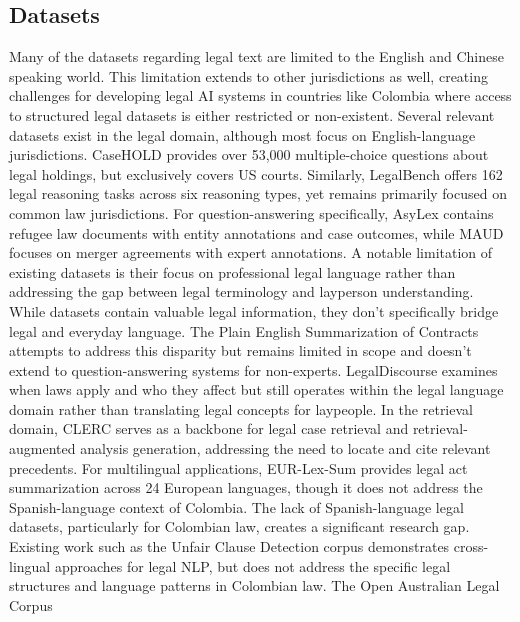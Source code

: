 \subsection{Datasets}
Many of the datasets regarding legal text are limited to the English and
Chinese speaking world. This limitation extends to other jurisdictions as well, 
creating challenges for developing legal AI systems in countries like Colombia 
where access to structured legal datasets is either restricted or non-existent.
Several relevant datasets exist in the legal domain, although most focus on 
English-language jurisdictions. CaseHOLD \cite{zheng2021does} provides over 
53,000 multiple-choice questions about legal holdings, but exclusively 
covers US courts. Similarly, LegalBench \cite{guha2023legalbench} offers 
162 legal reasoning tasks across six reasoning types, yet remains primarily 
focused on common law jurisdictions. For question-answering specifically, 
AsyLex \cite{tay2023asylex} contains refugee law documents with entity 
annotations and case outcomes, while MAUD \cite{wang2023maud} focuses 
on merger agreements with expert annotations.
A notable limitation of existing datasets is their focus on professional 
legal language rather than addressing the gap between legal terminology and 
layperson understanding. While datasets contain valuable legal information, 
they don't specifically bridge legal and everyday language. The Plain English 
Summarization of Contracts \cite{manor2019plain} attempts to address this disparity 
but remains limited in scope and doesn't extend to question-answering systems for 
non-experts. LegalDiscourse \cite{spangher-etal-2024-legaldiscourse} examines when 
laws apply and who they affect but still operates within the legal language domain 
rather than translating legal concepts for laypeople.
In the retrieval domain, CLERC \cite{hou2024clercdatasetlegalcase} serves as a 
backbone for legal case retrieval and retrieval-augmented analysis generation, 
addressing the need to locate and cite relevant precedents. For multilingual 
applications, EUR-Lex-Sum \cite{aumiller-etal-2022-eur} provides legal act 
summarization across 24 European languages, though it does not address the 
Spanish-language context of Colombia.
The lack of Spanish-language legal datasets, particularly for Colombian law, 
creates a significant research gap. Existing work such as the Unfair Clause 
Detection corpus \cite{Galassi2024} demonstrates cross-lingual approaches 
for legal NLP, but does not address the specific legal structures and language 
patterns in Colombian law. The Open Australian Legal Corpus \cite{butler-2025-open-australian-legal-corpus} 
